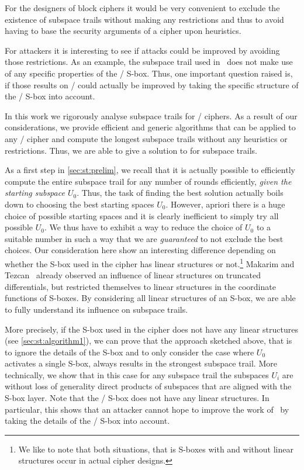 For the designers of block ciphers it would be very convenient to exclude the existence of subspace trails without making any restrictions and thus to avoid having to base the security arguments of a cipher upon heuristics.

For attackers it is interesting to see if attacks could be improved by avoiding those restrictions.
As an example, the subspace trail used in~\cite{EC:GraRecRon17} does not make use of any specific properties of the \AES/ S-box.
Thus, one important question raised is, if those results on \AES/ could actually be improved by taking the specific structure of the \AES/ S-box into account.

In this work we rigorously analyse subspace trails for \SPN/ ciphers.
As a result of our considerations, we provide efficient and generic algorithms that can be applied to any \SPN/ cipher and compute the longest subspace trails without any heuristics or restrictions.
Thus, we are able to give a solution to  for subspace trails.

As a first step in \cref{sec:st:prelim}, we recall that it is actually possible to efficiently compute the entire subspace trail for any number of rounds efficiently, \emph{given the starting subspace $U_0$}.
Thus, the task of finding the best solution actually boils down to choosing the best starting spaces $U_0$.
However, apriori there is a huge choice of possible starting spaces and it is clearly inefficient to simply try all possible $U_0$.
We thus have to exhibit a way to reduce the choice of $U_0$ to a suitable number in such a way that we are \emph{guaranteed} to not exclude the best choices.
Our consideration here show an interesting difference depending on whether the S-box used in the cipher has linear structures or not.\footnote{%
    We like to note that both situations, that is S-boxes with and without linear structures occur in actual cipher designs.
}
Makarim and Tezcan~\cite{LIGHTSEC:MakTez14} already observed an influence of linear structures on truncated differentials, but restricted themselves to linear structures in the coordinate functions of S-boxes.
By considering all linear structures of an S-box, we are able to fully understand its influence on subspace trails.

More precisely, if the S-box used in the cipher does not have any linear structures (see \cref{sec:st:algorithm1}), we can prove that the approach sketched above, that is to ignore the details of the S-box and to only consider the case where $U_0$ activates a single S-box, always results in the strongest subspace trail.
More technically, we show that in this case for any subspace trail the subspaces $U_i$ are without loss of generality direct products of subspaces that are aligned with the S-box layer.
Note that the \AES/ S-box does not have any linear structures.
In particular, this shows that an attacker cannot hope to improve the work of~\cite{EC:GraRecRon17} by taking the details of the \AES/ S-box into account.

